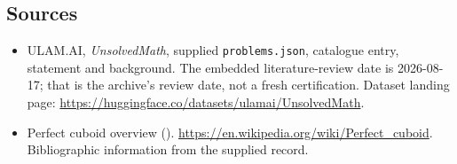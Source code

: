 \documentclass[11pt,a4paper]{article}
\begin{document}
\subsection{Sources}

{\small

\begin{itemize}

\item[\hypertarget{source:statement:1}{S1}] ULAM.AI, \emph{UnsolvedMath}, supplied \texttt{problems.json}, catalogue entry, statement and background. The embedded literature-review date is 2026-08-17; that is the archive’s review date, not a fresh certification. Dataset landing page: \url{https://huggingface.co/datasets/ulamai/UnsolvedMath}.

\item[\hypertarget{source:statement:2}{S2}] Perfect cuboid overview (). \url{https://en.wikipedia.org/wiki/Perfect_cuboid}. Bibliographic information from the supplied record.

\end{itemize}

}

\label{end:statement}
\end{document}
